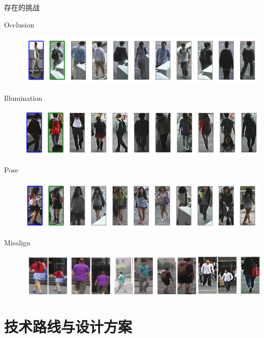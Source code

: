 \documentclass[notes]{beamer}
\begin{document}
\begin{frame}
	{存在的挑战}
	\begin{description}
		\item[Occlusion] \includegraphics[width=0.9\linewidth]{2018-03-12-10-09-03.png}
		\item[Illumination] \includegraphics[width=0.9\linewidth]{2018-03-12-10-10-10.png}
		\item[Pose] \includegraphics[width=0.9\linewidth]{2018-03-12-10-10-18.png}
		\item[Misalign] \includegraphics[width=0.88\linewidth]{2018-03-07-20-16-25.png}
	\end{description}
	
\end{frame}

\section{技术路线与设计方案}
\end{document}
